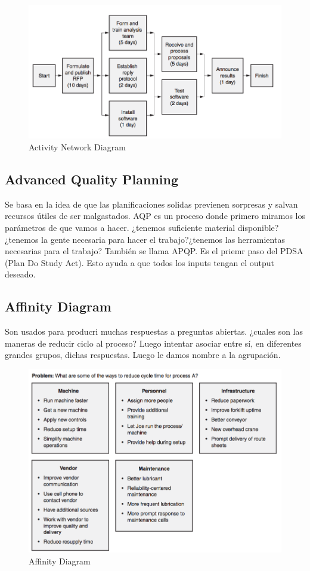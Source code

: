 \documentclass[]{article}
\begin{document}
\begin{figure}[ht!]
	\centering
	\includegraphics[width=120mm]{imagenes/AND.png}
	\caption{Activity Network Diagram}
	\label{fig:ANDDiagram}
\end{figure}

\subsection{Advanced Quality Planning} 

Se basa en la idea de que las planificaciones solidas previenen sorpresas y salvan recursos útiles de ser malgastados. AQP es un proceso donde primero miramos los parámetros de que vamos a hacer. ¿tenemos suficiente material disponible? ¿tenemos la gente necesaria para hacer el trabajo?¿tenemos las herramientas necesarias para el trabajo? También se llama APQP. 
Es el priemr paso del PDSA (Plan Do Study Act). Esto ayuda a que todos los inputs tengan el output deseado.

\subsection{Affinity Diagram}

Son usados para producri muchas respuestas a preguntas abiertas. ¿cuales son las maneras de reducir ciclo al proceso? Luego intentar asociar entre sí, en diferentes grandes grupos, dichas respuestas. Luego le damos nombre a la agrupación.

\begin{figure}[ht!]
	\centering
	\includegraphics[width=120mm]{imagenes/AffinityDiagram.png}
	\caption{Affinity Diagram}
	\label{fig:AffinityDiagram}
\end{figure}
\end{document}

